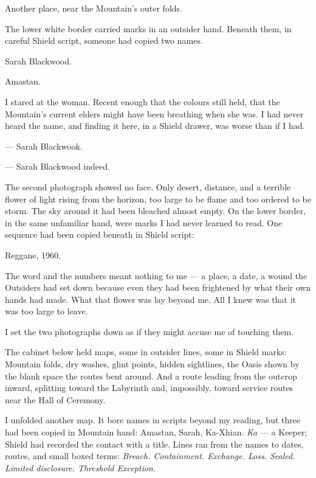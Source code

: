 Another place, near the Mountain's outer folds.\par

The lower white border carried marks in an outsider hand. Beneath them, in careful Shield script, someone had copied two names.\par

Sarah Blackwood.\par

Amastan.\par

I stared at the woman. Recent enough that the colours still held, that the Mountain's current elders might have been breathing when she was. I had never heard the name, and finding it here, in a Shield drawer, was worse than if I had.\par
\begin{room}
--- Sarah Blackwook.

--- Sarah Blackwood indeed.
\end{room}

The second photograph showed no face. Only desert, distance, and a terrible flower of light rising from the horizon, too large to be flame and too ordered to be storm. The sky around it had been bleached almost empty. On the lower border, in the same unfamiliar hand, were marks I had never learned to read. One sequence had been copied beneath in Shield script:\par

Reggane, 1960.\par

The word and the numbers meant nothing to me --- a place, a date, a wound the Outsiders had set down because even they had been frightened by what their own hands had made. What that flower was lay beyond me. All I knew was that it was too large to leave.\par

I set the two photographs down as if they might accuse me of touching them.\par

The cabinet below held maps, some in outsider lines, some in Shield marks: Mountain folds, dry washes, glint points, hidden sightlines, the Oasis shown by the blank space the routes bent around. And a route leading from the outcrop inward, splitting toward the Labyrinth and, impossibly, toward service routes near the Hall of Ceremony.\par

I unfolded another map. It bore names in scripts beyond my reading, but three had been copied in Mountain hand: Amastan, Sarah, Ka-Xhian. \emph{Ka} --- a Keeper; Shield had recorded the contact with a title. Lines ran from the names to dates, routes, and small boxed terms: \textit{Breach. Containment. Exchange. Loss. Sealed. Limited disclosure. Threshold Exception.}\par

